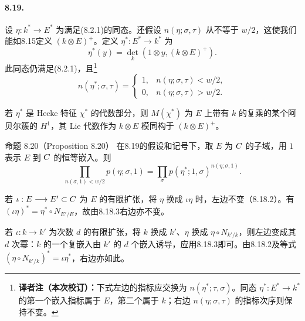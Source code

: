 \paragraph*{8.19.}
设 $\eta:k^*\longrightarrow E^*$ 为满足(8.2.1)的同态。还假设 $n(\eta;\sigma,\tau)$ 从不等于 $w/2$，这使我们能如8.15定义 $(k\otimes E)^+$。定义 $\eta^*:E^*\longrightarrow k^*$ 为
\[
 \eta^*(y)=\det_k(1\otimes y,(k\otimes E)^+).
\]
此同态仍满足(8.2.1)，且\footnote{\textbf{译者注（本次校订）：}下式左边的指标应交换为 $n(\eta^*;\tau,\sigma)$。同态 $\eta^*:E^*\to k^*$ 的第一个嵌入指标属于 $E$，第二个属于 $k$；右边 $n(\eta;\sigma,\tau)$ 的指标次序则保持不变。}
\[
 n(\eta^*;\sigma,\tau)=
 \begin{cases}1,&n(\eta;\sigma,\tau)<w/2,\\0,&n(\eta;\sigma,\tau)>w/2.\end{cases}
\]

若 $\eta^*$ 是 Hecke 特征 $\chi^*$ 的代数部分，则 $M(\chi^*)$ 为 $E$ 上带有 $k$ 的复乘的某个阿贝尔簇的 $H^1$，其 Lie 代数作为 $k\otimes E$ 模同构于 $(k\otimes E)^+$。

\begin{originaltheorem}{命题 8.20（Proposition 8.20）}
在8.19的假设和记号下，取 $E$ 为 $C$ 的子域，用 $1$ 表示 $E$ 到 $C$ 的恒等嵌入。则
\[
 \prod_{n(\sigma,1)<w/2}p(\eta;\sigma,1)
 =\prod_\sigma p(\eta^*;1,\sigma)^{n(\eta;\sigma,1)}.
\]
\end{originaltheorem}

若 $\iota:E\longrightarrow E'\subset C$ 为 $E$ 的有限扩张，将 $\eta$ 换成 $\iota\eta$ 时，左边不变（8.18.2）。有 $(\iota\eta)^*=\eta^*\circ N_{E'/E}$，故由8.18.3右边亦不变。

若 $\iota:k\longrightarrow k'$ 为次数 $d$ 的有限扩张，将 $k$ 换成 $k'$、$\eta$ 换成 $\eta\circ N_{k'/k}$，则左边变成其 $d$ 次幂：$k$ 的一个复嵌入由 $k'$ 的 $d$ 个嵌入诱导，应用8.18.3即可。由8.18.2及等式 $(\eta\circ N_{k'/k})^*=\iota\eta^*$，右边亦如此。


